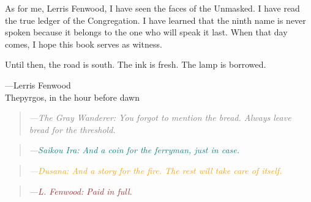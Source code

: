 \documentclass[10pt, twoside]{book}
\newcommand{\greyblock}[1]{%
  \begin{quote}
    \textcolor{gray}{\textit{---The Gray Wanderer: #1}}%
  \end{quote}%
}
\newcommand{\saikoublock}[1]{%
  \begin{quote}
    \textcolor{teal}{\textit{---Saikou Ira: #1}}%
  \end{quote}%
}
\newcommand{\dusanablock}[1]{%
  \begin{quote}
    \textcolor{orange}{\textit{---Dusana: #1}}%
  \end{quote}%
}
\newcommand{\lerrisblock}[1]{%
  \begin{quote}
    \textcolor{brown}{\textit{---L. Fenwood: #1}}%
  \end{quote}%
}
\begin{document}
As for me, Lerris Fenwood, I have seen the faces of the Unmasked. I have read the true ledger of the Congregation. I have learned that the ninth name is never spoken because it belongs to the one who will speak it last. When that day comes, I hope this book serves as witness.

Until then, the road is south. The ink is fresh. The lamp is borrowed.

---Lerris Fenwood\\
Thepyrgos, in the hour before dawn

\greyblock{You forgot to mention the bread. Always leave bread for the threshold.}

\saikoublock{And a coin for the ferryman, just in case.}

\dusanablock{And a story for the fire. The rest will take care of itself.}

\lerrisblock{Paid in full.}


\end{document}
